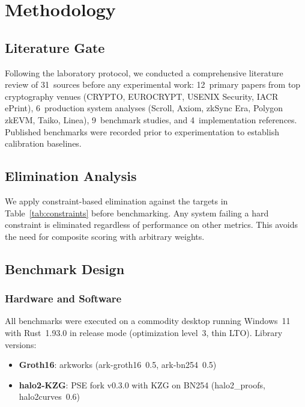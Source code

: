 
\section{Methodology}
\label{sec:methodology}

\subsection{Literature Gate}

Following the laboratory protocol, we conducted a comprehensive
literature review of 31~sources before any experimental work:
12~primary papers from top cryptography venues (CRYPTO,
EUROCRYPT, USENIX Security, IACR ePrint), 6~production system
analyses (Scroll, Axiom, zkSync Era, Polygon zkEVM, Taiko,
Linea), 9~benchmark studies, and 4~implementation references.
Published benchmarks were recorded prior to experimentation to
establish calibration baselines.

\subsection{Elimination Analysis}

We apply constraint-based elimination against the targets in
Table~\ref{tab:constraints} before benchmarking. Any system
failing a hard constraint is eliminated regardless of
performance on other metrics. This avoids the need for
composite scoring with arbitrary weights.

\subsection{Benchmark Design}

\subsubsection{Hardware and Software}

All benchmarks were executed on a commodity desktop running
Windows~11 with Rust~1.93.0 in release mode (optimization
level~3, thin LTO). Library versions:

\begin{itemize}
  \item \textbf{Groth16}: arkworks (ark-groth16~0.5,
    ark-bn254~0.5)
  \item \textbf{halo2-KZG}: PSE fork v0.3.0 with KZG on BN254
    (halo2\_proofs, halo2curves~0.6)
\end{itemize}

